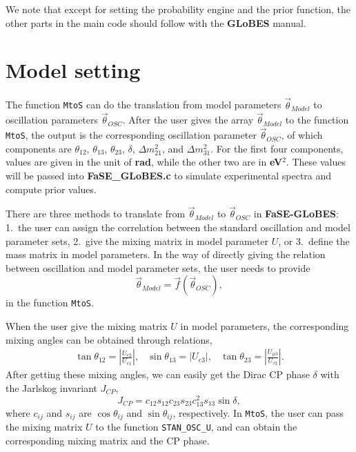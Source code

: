 \documentclass[aps,prd,nofootinbib,preprint]{revtex4}
\begin{document}
We note that except for setting the probability engine and the prior function, the other parts in the main code should follow with the \textbf{GLoBES} manual. 


\section{Model setting}\label{sec:model_set}

The function \texttt{MtoS} can do the translation from model parameters $\vec{\theta}_{Model}$ to oscillation parameters $\vec{\theta}_{OSC}$. After the user gives the array $\vec{\theta}_{Model}$ to the function \texttt{MtoS}, the output is the corresponding oscillation parameter $\vec{\theta}_{OSC}$, of which components are $\theta_{12}$, $\theta_{13}$, $\theta_{23}$, $\delta$, $\Delta m_{21}^2$, and $\Delta m_{31}^2$. For the first four components, values are given in the unit of \textbf{rad}, while the other two are in \textbf{eV$^2$}. These values will be passed into \textbf{FaSE\_GLoBES.c} to simulate experimental spectra and compute prior values.

{\color{blue}There are three methods to translate from $\vec{\theta}_{Model}$ to $\vec{\theta}_{OSC}$ in \textbf{FaSE-GLoBES}:} 1.~the user can assign the correlation between the standard oscillation and model parameter sets{\color{blue}, 2.~give the mixing matrix in model parameter $U$}, or 3.~define the mass matrix in model parameters. 
In the way of directly giving the relation between oscillation and model parameter sets, the user needs to provide
{\color{blue}
\begin{equation}
\vec{\theta}_{Model}=\vec{f}(\vec{\theta}_{OSC}), 
\end{equation}
in the function \texttt{MtoS}. }
%

{\color{blue}When the user give the mixing matrix $U$ in model parameters, the corresponding mixing angles can be obtained through relations,
\begin{eqnarray}\label{eq:U_angle}
\tan\theta_{12}=\left|\frac{U_{e2}}{U_{e1}}\right|,&  \sin\theta_{13}=|U_{e3}|,& \tan\theta_{23} = \left|\frac{U_{\mu 3}}{U_{\tau 3}}\right|.
\end{eqnarray}
After getting these mixing angles, we can easily get the Dirac CP phase $\delta$ with the Jarlskog invariant $J_{CP}$,\
\begin{equation}\label{eq:U_phase}
J_{CP}=c_{12}s_{12}c_{23}s_{23}c_{13}^2s_{13}\sin\delta,
\end{equation}
where $c_{ij}$ and $s_{ij}$ are $\cos \theta_{ij}$ and $\sin\theta_{ij}$, respectively. In \texttt{MtoS}, the user can pass the mixing matrix $U$ to the function  \texttt{STAN\_OSC\_U}, and can obtain the corresponding mixing matrix and the CP phase. 
}
\end{document}
